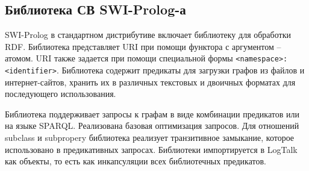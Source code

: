 \documentclass[conference]{IEEEtran} \IEEEoverridecommandlockouts
\begin{document}
\subsection{Библиотека СВ SWI-Prolog-а} \label{sec:swi-sw} 

SWI-Prolog в стандартном дистрибутиве включает библиотеку для обработки RDF. Библиотека представляет URI при помощи функтора с аргументом -- атомом. URI также задается при помощи специальной формы \texttt{<namespace>:<identifier>}. Библиотека содержит предикаты для загрузки графов из файлов и интернет-сайтов, хранить их в различных текстовых и двоичных форматах для последующего использования. 

Библиотека поддерживает запросы к графам в виде комбинации предикатов или на языке SPARQL. Реализована базовая оптимизация запросов. Для отношений subclass и subpropery библиотека реализует транзитивное замыкание, которое использовано в предикативных запросах. Библиотеки импортируется в LogTalk как объекты, то есть как инкапсуляции всех библиотечных предикатов. 
\end{document}
